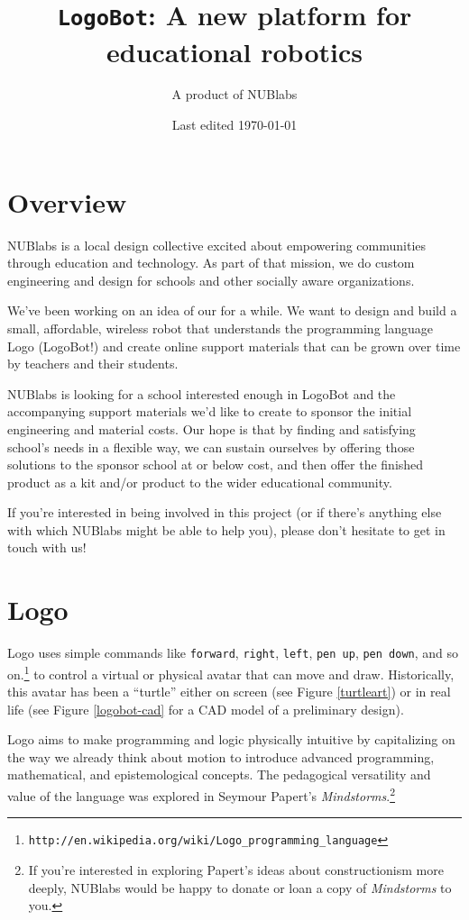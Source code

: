 \documentclass[10pt]{article}
\title{\texttt{LogoBot}: A new platform for educational robotics}
\author{A product of NUBlabs}
\date{Last edited \today}
\begin{document}
\maketitle
\section{Overview}
NUBlabs is a local design collective excited about empowering communities through education and technology.  As part of that mission, we do custom engineering and design for schools and other socially aware organizations.

We've been working on an idea of our for a while.  We want to design and build a small, affordable, wireless robot that understands the programming language Logo (LogoBot!) and create online support materials that can be grown over time by teachers and their students.

NUBlabs is looking for a school interested enough in LogoBot and the accompanying support materials we'd like to create to sponsor the initial engineering and material costs.  Our hope is that by finding and satisfying school's needs in a flexible way, we can sustain ourselves by offering those solutions to the sponsor school at or below cost, and then offer the finished product as a kit and/or product to the wider educational community.

If you're interested in being involved in this project (or if there's anything else with which NUBlabs might be able to help you), please don't hesitate to get in touch with us!
  
\section{Logo}
Logo uses simple commands like \texttt{forward}, \texttt{right}, \texttt{left}, \texttt{pen up}, \texttt{pen down}, and so on.\footnote{\texttt{http://en.wikipedia.org/wiki/Logo\_programming\_language}} to control a virtual or physical avatar that can move and draw.  Historically, this avatar has been a ``turtle'' either on screen (see Figure \ref{turtleart}) or in real life (see Figure \ref{logobot-cad} for a CAD model of a preliminary design).  

Logo aims to make programming and logic physically intuitive by capitalizing on the way we already think about motion to introduce advanced programming, mathematical, and epistemological concepts.  The pedagogical versatility and value of the language was explored in Seymour Papert's \textit{Mindstorms}.\footnote{If you're interested in exploring Papert's ideas about constructionism more deeply, NUBlabs would be happy to donate or loan a copy of \textit{Mindstorms} to you.}
\end{document}
